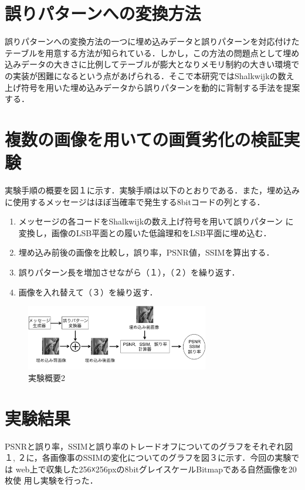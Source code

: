 \documentclass[a4j,fleqn,10pt]{jsarticle}
\begin{document}
\section{誤りパターンへの変換方法}
誤りパターンへの変換方法の一つに埋め込みデータと誤りパターンを対応付けた
テーブルを用意する方法が知られている．しかし，この方法の問題点として埋め
込みデータの大きさに比例してテーブルが膨大となりメモリ制約の大きい環境で
の実装が困難になるという点があげられる\cite{Paper01}．そこで本研究ではShalkwijkの数え
上げ符号\cite{Paper02}を用いた埋め込みデータから誤りパターンを動的に背制する手法を提案
する．

\section{複数の画像を用いての画質劣化の検証実験}
実験手順の概要を図１に示す．実験手順は以下のとおりである．また，埋め込み
に使用するメッセージはほぼ当確率で発生する8bitコードの列とする．
\begin{enumerate}
\renewcommand{\labelenumi}{(\arabic{enumi})}
 \item メッセージの各コードをShalkwijkの数え上げ符号を用いて誤りパターン
       に変換し，画像のLSB平面との履いた低論理和をLSB平面に埋め込む．
 \item 埋め込み前後の画像を比較し，誤り率，PSNR値，SSIMを算出する．
 \item 誤りパターン長を増加させながら（１），（２）を繰り返す．
 \item 画像を入れ替えて（３）を繰り返す．
\end{enumerate}

\begin{figure}[htbp]
 \begin{center}
  \includegraphics[width=8cm]{experiment1.png}
 \end{center}
 \caption{実験概要2}
\end{figure}

\section{実験結果}
PSNRと誤り率，SSIMと誤り率のトレードオフについてのグラフをそれぞれ図１,
２に，各画像事のSSIMの変化についてのグラフを図３に示す．今回の実験では
web上で収集した256☓256pxの8bitグレイスケールBitmapである自然画像を20枚使
用し実験を行った．
\end{document}
